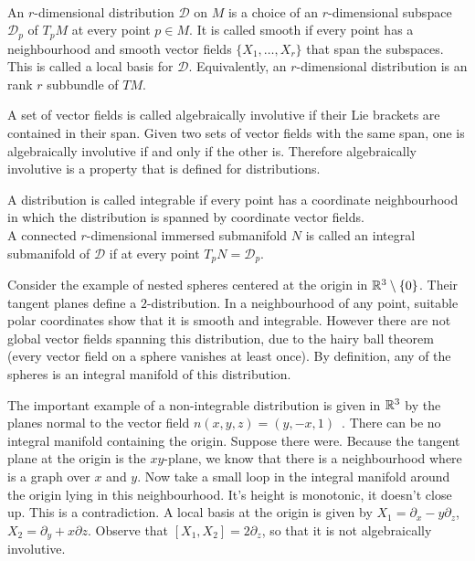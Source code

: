 \begin{definition}
\textup{\cite[2.2.1,.2.2.2,2.3.2]{Sharpe1997}} \\
An $r$-dimensional distribution $\mathcal{D}$ on $M$ is a choice of an $r$-dimensional subspace $\mathcal{D}_p$ of $T_p M$ at every point $p \in M$.
It is called smooth if every point has a neighbourhood and smooth vector fields $\{X_1, \dots, X_r \}$ that span the subspaces.
This is called a local basis for $\mathcal{D}$.
Equivalently, an $r$-dimensional distribution is an rank $r$ subbundle of $TM$.

A set of vector fields is called algebraically involutive if their Lie brackets are contained in their span.
Given two sets of vector fields with the same span, one is algebraically involutive if and only if the other is.
Therefore algebraically involutive is a property that is defined for distributions.

A distribution is called integrable if every point has a coordinate neighbourhood in which the distribution is spanned by coordinate vector fields.
\\
A connected $r$-dimensional immersed submanifold $N$ is called an integral submanifold of $\mathcal{D}$ if at every point $T_pN = \mathcal{D}_p$.
\end{definition}

Consider the example of nested spheres centered at the origin in $\mathbb{R}^3\setminus\{0\}$. 
Their tangent planes define a $2$-distribution.
In a neighbourhood of any point, suitable polar coordinates show that it is smooth and integrable.
However there are not global vector fields spanning this distribution, due to the hairy ball theorem (every vector field on a sphere vanishes at least once).
By definition, any of the spheres is an integral manifold of this distribution.

The important example of a non-integrable distribution is given in $\mathbb{R}^3$ by the planes normal to the vector field $n(x,y,z)=(y,-x,1)$~\cite[Ex~2.3.1]{Sharpe1997}.
There can be no integral manifold containing the origin.
Suppose there were.
Because the tangent plane at the origin is the $xy$-plane, we know that there is a neighbourhood where is a graph over $x$ and $y$.
Now take a small loop in the integral manifold around the origin lying in this neighbourhood.
It's height is monotonic, it doesn't close up.
This is a contradiction.
A local basis at the origin is given by $X_1 = \partial_x - y \partial_z$, $X_2 = \partial_y + x\partial z$.
Observe that $[X_1,X_2] = 2\partial_z$, so that it is not algebraically involutive.


